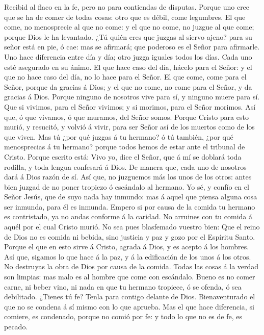  Recibid al flaco en la fe, pero no para contiendas de
disputas.  Porque uno cree que se ha de comer de todas
cosas: otro que es débil, come legumbres.  El que come, no
menosprecie al que no come: y el que no come, no juzgue al que come;
porque Dios le ha levantado.  ¿Tú quién eres que juzgas al
siervo ajeno? para su señor está en pie, ó cae: mas se afirmará; que
poderoso es el Señor para afirmarle.  Uno hace diferencia
entre día y día; otro juzga iguales todos los días. Cada uno esté
asegurado en su ánimo.  El que hace caso del día, hácelo
para el Señor: y el que no hace caso del día, no lo hace para el Señor.
El que come, come para el Señor, porque da gracias á Dios; y el que no
come, no come para el Señor, y da gracias á Dios.  Porque
ninguno de nosotros vive para sí, y ninguno muere para sí.
 Que si vivimos, para el Señor vivimos; y si morimos, para
el Señor morimos. Así que, ó que vivamos, ó que muramos, del Señor
somos.  Porque Cristo para esto murió, y resucitó, y
volvió á vivir, para ser Señor así de los muertos como de los que viven.
 Mas tú ¿por qué juzgas á tu hermano? ó tú también, ¿por
qué menosprecias á tu hermano? porque todos hemos de estar ante el
tribunal de Cristo.  Porque escrito está: Vivo yo, dice
el Señor, que á mí se doblará toda rodilla, y toda lengua confesará á
Dios.  De manera que, cada uno de nosotros dará á Dios
razón de sí.  Así que, no juzguemos más los unos de los
otros: antes bien juzgad de no poner tropiezo ó escándalo al hermano.
 Yo sé, y confío en el Señor Jesús, que de suyo nada hay
inmundo: mas á aquel que piensa alguna cosa ser inmunda, para él es
inmunda.  Empero si por causa de la comida tu hermano es
contristado, ya no andas conforme á la caridad. No arruines con tu
comida á aquél por el cual Cristo murió.  No sea pues
blasfemado vuestro bien:  Que el reino de Dios no es
comida ni bebida, sino justicia y paz y gozo por el Espíritu Santo.
 Porque el que en esto sirve á Cristo, agrada á Dios, y
es acepto á los hombres.  Así que, sigamos lo que hace á
la paz, y á la edificación de los unos á los otros.  No
destruyas la obra de Dios por causa de la comida. Todas las cosas á la
verdad son limpias: mas malo es al hombre que come con escándalo.
 Bueno es no comer carne, ni beber vino, ni nada en que
tu hermano tropiece, ó se ofenda, ó sea debilitado. 
¿Tienes tú fe? Tenla para contigo delante de Dios. Bienaventurado el que
no se condena á sí mismo con lo que aprueba.  Mas el que
hace diferencia, si comiere, es condenado, porque no comió por fe: y
todo lo que no es de fe, es pecado.

